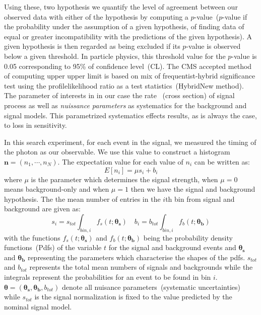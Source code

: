 Using these, two hypothesis we quantify the level of agreement between our observed data with either of the hypothesis by computing a $p$-value~($p$-value if the probability under the assumption of a given hypothesis, of finding data of equal or greater incompatibility with the predictions of the given hypothesis).
A given hypothesis is then regarded as being excluded if its $p$-value is observed below a given threshold. In particle physics, this threshold value for the $p$-value is 0.05 corresponding to 95\% of confidence level~(CL).
The CMS accepted method of computing upper upper limit is based on mix of frequentist-hybrid significance test using the profilelikelihood ratio as a test statistics~(HybridNew method). 
The parameter of interests in in our case the rate ~(cross section) of signal process as well as \textit{nuissance parameters} as systematics for the background and signal models. This parametrized systematics effects results, as is always the case, to loss in sensitivity.

In this search experiment, for each event in the signal, we measured the timing of the photon as our observable. We use this value to construct a histogram $\mathbf{n} = \left( n_{1}, \cdots, n_{N}\right)$. The expectation value for each value of $n_{i}$ can be written as:
\begin{equation}
 E[n_{i}] = \mu s_{i} + b_{i}
\end{equation}
where $\mu$ is the parameter which determines the signal strength, when $\mu = 0$ means background-only and when $\mu=1$ then we have the signal and background hypothesis. The the mean number of entries in the $i$th bin from signal and background are given as:
\begin{equation}
s_{i} = s_{tot} \int_{bin, i} f_{s}\left(t;\mathbf{\theta_{s}}\right) \quad 
b_{i} = b_{tot} \int_{bin, i} f_{b}\left(t;\mathbf{\theta_{b}}\right)
\end{equation}
with the functions $f_{s}\left(t;\mathbf{\theta_{s}}\right) $ and $f_{b}\left(t;\mathbf{\theta_{b}}\right) $ being the probability density functions~(Pdfs) of the variable $t$ for the signal and background events and $\mathbf{\theta_{s}} $ and $\mathbf{\theta_{b}} $ representing the parameters which characterise the shapes of the pdfs. $s_{tot}$ and $b_{tot}$ represents the total mean numbers of signals and backgrounds while the integrals represent the probabilities for an event to be found in bin $i$. $\mathbf{\theta} = \left( \mathbf{\theta_{s}}, \mathbf{\theta_{b}}, b_{tot} \right)$ denote all nuisance parameters~(systematic uncertainties) while $s_{tot}$ is the signal normalization is fixed to the value predicted by the nominal signal model.

